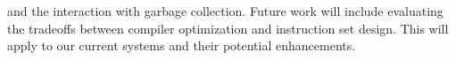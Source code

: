 
%


\renewcommand{\baselinestretch}{0.9}\large\normalsize
\setcounter{section}{4}
\setcounter{table}{12}
\setcounter{subsection}{2}
\noindent
and the interaction with garbage collection.
Future work will include evaluating the tradeoffs between compiler
optimization and instruction set design. This will apply to our
current systems and their potential enhancements.


\small



